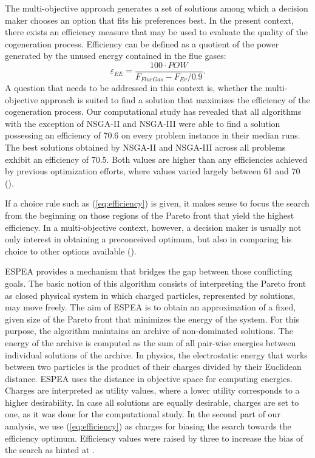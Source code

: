 The multi-objective approach generates a set of solutions among which a decision maker chooses an option that fits his preferences best. In the present context, there exists an efficiency measure that may be used to evaluate the quality of the cogeneration process. Efficiency can be defined as a quotient of the power generated by the unused energy contained in the flue gases:
%
\begin{equation}
\label{eq:efficiency}
\varepsilon_{EE} = \frac{100 \cdot POW}{F_{FlueGas} - F_{Ev}/0.9}.
\end{equation}
%
A question that needs to be addressed in this context is, whether the multi-objective approach is suited to find a solution that maximizes the efficiency of the cogeneration process. Our computational study has revealed that all algorithms with the exception of NSGA-II and NSGA-III were able to find a solution possessing an efficiency of 70.6 on every problem instance in their median runs. The best solutions obtained by NSGA-II and NSGA-III across all problems exhibit an efficiency of 70.5. Both values are higher than any efficiencies achieved by previous optimization efforts, where values varied largely between 61 and 70 (\cite[Fig. 11]{Seijo2016309}).

If a choice rule such as (\ref{eq:efficiency}) is given, it makes sense to focus the search from the beginning on those regions of the Pareto front that yield the highest efficiency. In a multi-objective context, however, a decision maker is usually not only interest in obtaining a preconceived optimum, but also in comparing his choice to other options available (\cite{roy1996multicriteria,kahneman1979prospect}).

ESPEA provides a mechanism that bridges the gap between those conflicting goals. The basic notion of this algorithm consists of interpreting the Pareto front as closed physical system in which charged particles, represented by solutions, may move freely. The aim of ESPEA is to obtain an approximation of a fixed, given size of the Pareto front that minimizes the energy of the system. For this purpose, the algorithm maintains an archive of non-dominated solutions. The energy of the archive is computed as the sum of all pair-wise energies between individual solutions of the archive. In physics, the electrostatic energy that works between two particles is the product of their charges divided by their Euclidean distance. ESPEA uses the distance in objective space for computing energies. Charges are interpreted as utility values, where a lower utility corresponds to a higher desirability. In case all solutions are equally desirable, charges are set to one, as it was done for the computational study. In the second part of our analysis, we use (\ref{eq:efficiency}) as charges for biasing the search towards the efficiency optimum. Efficiency values were raised by three to increase the bias of the search as hinted at \cite{espea}.

